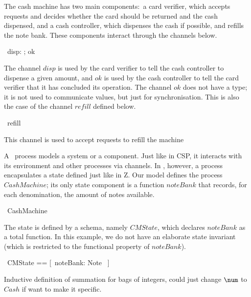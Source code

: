 \documentclass{article}
\begin{document}
The cash machine has two main components:~a card verifier, which
accepts requests and decides whether the card should be returned and
the cash dispensed, and a cash controller, which dispenses the cash
if possible, and refills the note bank. These components interact
through the channels below.
\begin{circus}
  \circchannel\ disp: \nat; ok
\end{circus}
The channel $disp$ is used by the card verifier to tell the cash
controller to dispense a given amount, and $ok$ is used by the cash
controller to tell the card verifier that it has concluded its
operation. The channel $ok$ does not have a type; it is not used to
communicate values, but just for synchronisation.  This is also the
case of the channel $refill$ defined below.
\begin{circus}
  \circchannel\ refill
\end{circus}
This channel is used to accept requests to refill the machine

A \Circus\ process models a system or a component.  Just like in CSP,
it interacts with its environment and other processes via channels.
In \Circus, however, a process encapsulates a state defined just like
in Z.  Our model defines the process $CashMachine$; its only state
component is a function $noteBank$ that records, for each
denomination, the amount of notes available.
\begin{circus}
  \circprocess\ CashMachine \circdef \circbegin
\end{circus}
The state is defined by a schema, namely $CMState$, which declares
$noteBank$ as a total function.  In this example, we do not have an
elaborate state invariant (which is restricted to the functional
property of $noteBank$).
\begin{circusaction}
  \circstate\ CMState == [~noteBank: Note \fun \nat~]
\end{circusaction}

Inductive definition of summation for bags of integers,
could just change $\num$ to $Cash$ if want to make it specific.
%
\end{document}

